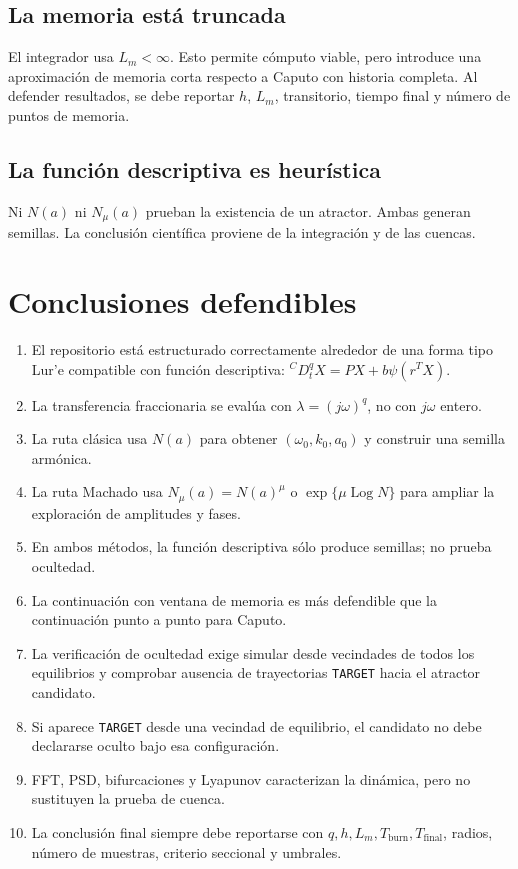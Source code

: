 \documentclass[11pt]{article}
\newcommand{\Log}{\operatorname{Log}}
\begin{document}
\subsection{La memoria está truncada}

El integrador usa \(L_m<\infty\). Esto permite cómputo viable, pero introduce una aproximación de memoria corta respecto a Caputo con historia completa. Al defender resultados, se debe reportar \(h\), \(L_m\), transitorio, tiempo final y número de puntos de memoria.

\subsection{La función descriptiva es heurística}

Ni \(N(a)\) ni \(N_\mu(a)\) prueban la existencia de un atractor. Ambas generan semillas. La conclusión científica proviene de la integración y de las cuencas.

\section{Conclusiones defendibles}

\begin{enumerate}[label=\arabic*.]
\item El repositorio está estructurado correctamente alrededor de una forma tipo Lur'e compatible con función descriptiva: \({}^C D_t^qX=PX+b\psi(r^TX)\).
\item La transferencia fraccionaria se evalúa con \(\lambda=(j\omega)^q\), no con \(j\omega\) entero.
\item La ruta clásica usa \(N(a)\) para obtener \((\omega_0,k_0,a_0)\) y construir una semilla armónica.
\item La ruta Machado usa \(N_\mu(a)=N(a)^\mu\) o \(\exp\{\mu\Log N\}\) para ampliar la exploración de amplitudes y fases.
\item En ambos métodos, la función descriptiva sólo produce semillas; no prueba ocultedad.
\item La continuación con ventana de memoria es más defendible que la continuación punto a punto para Caputo.
\item La verificación de ocultedad exige simular desde vecindades de todos los equilibrios y comprobar ausencia de trayectorias \texttt{TARGET} hacia el atractor candidato.
\item Si aparece \texttt{TARGET} desde una vecindad de equilibrio, el candidato no debe declararse oculto bajo esa configuración.
\item FFT, PSD, bifurcaciones y Lyapunov caracterizan la dinámica, pero no sustituyen la prueba de cuenca.
\item La conclusión final siempre debe reportarse con \(q,h,L_m,T_{\mathrm{burn}},T_{\mathrm{final}}\), radios, número de muestras, criterio seccional y umbrales.
\end{enumerate}
\end{document}
